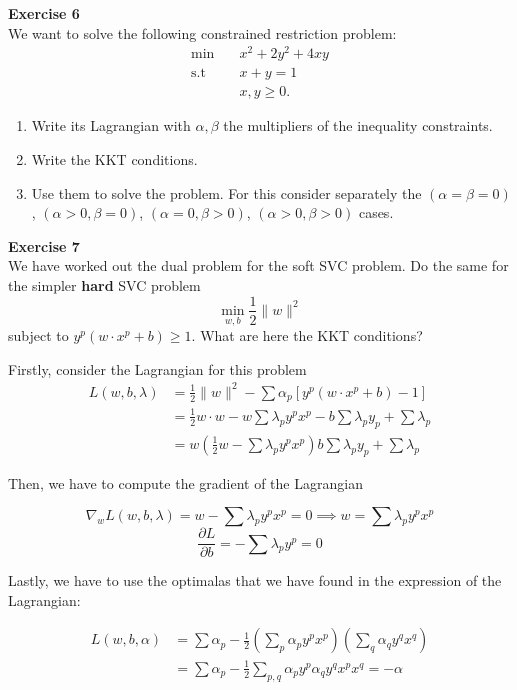 \documentclass[11pt,table]{article}
\newenvironment{problem}[2][Exercise]
    { \begin{mdframed}[backgroundcolor=gray!20] \textbf{#1 #2} \\}
    {  \end{mdframed}}
\newcommand\norm[1]{\lVert#1\rVert}
\begin{document}
\begin{problem}{6}
  We want to solve the following constrained restriction problem:
  \begin{align*}
    \min \quad &  x^{2} + 2y^{2} + 4xy \\
    \text{s.t} \quad &  x + y = 1 \\
    & x,y \geq 0.
  \end{align*}
  \begin{enumerate}
    \item Write its Lagrangian with \(\alpha,\beta\) the multipliers of the inequality constraints.
    \item Write the KKT conditions.
          \item Use them to solve the problem. For this consider separately the \((\alpha = \beta = 0)\), \((\alpha > 0, \beta = 0)\), \((\alpha = 0, \beta > 0)\), \((\alpha > 0, \beta > 0)\) cases.
\end{enumerate}
\end{problem}

\begin{problem}{7}
	We have worked out the dual problem for the soft SVC problem. Do the same for the simpler \textbf{hard} SVC problem
	\[
	\min_{w,b} \frac{1}{2} \norm{w}^2  
	\]
	subject to \(y^p\left(w \cdot x^p + b\right) \geq 1\). What are here the KKT conditions?
\end{problem}

Firstly, consider the Lagrangian for this problem
\begin{align*}
L(w,b,\lambda) & = \frac{1}{2} \norm{w}^2 - \sum \alpha_p \left[ y^p \left(w \cdot x^p +b\right) -1 \right]\\
& = \frac{1}{2} w \cdot w - w \sum \lambda_p y^p  x^p - b \sum \lambda_p y_p + \sum \lambda_p \\
& = w \left(\frac{1}{2}w -\sum \lambda_p y^p  x^p \right) b \sum \lambda_p y_p + \sum \lambda_p
\end{align*}

Then, we have to compute the gradient of the Lagrangian

\[
	\nabla_w L(w,b,\lambda) = w - \sum \lambda_p y^p x^p = 0 \implies w = \sum \lambda_p y^p x^p
\]
\[
	\frac{\partial L}{\partial b} = - \sum \lambda_p y^p = 0  
\]

Lastly, we have to use the optimalas that we have found in the expression of the Lagrangian:

\begin{align*}
	L(w,b,\alpha) &= \sum \alpha_p  - \frac{1}{2}\left(\sum_p \alpha_p y^p x^p\right)\left(\sum_q \alpha_q y^q x^q\right) \\
	& = \sum \alpha_p - \frac{1}{2} \sum_{p,q} \alpha_p y^p \alpha_q y^q x^p x^q = - \alpha
\end{align*}
\end{document}
